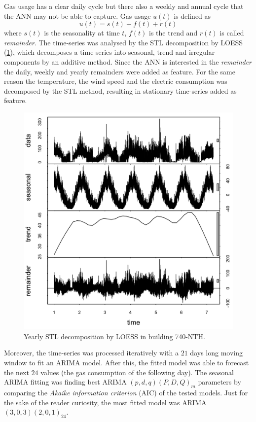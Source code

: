 \documentclass{sig-alternate-sigmod07}
\begin{document}
Gas usage has a clear daily cycle but there also a weekly and annual cycle that the ANN may not be able to capture. Gas usage $u(t)$ is defined as \begin{displaymath}u(t) = s(t) + f(t) + r(t)\end{displaymath} where $s(t)$ is the seasonality at time $t$, $f(t)$ is the trend and $r(t)$ is called \emph{remainder}. The time-series was analysed by the STL decomposition by LOESS \cite{cleveland1990stl}(\cref{fig:STL}), which decomposes a time-series into seasonal, trend and irregular components by an additive method. Since the ANN is interested in the \emph{remainder} the daily, weekly and yearly remainders were added as feature. For the same reason the temperature, the wind speed and the electric consumption was decomposed by the STL method, resulting in stationary time-series added as feature.

\begin{figure}
\centering
\includegraphics[width=\columnwidth]{images/STL.png}
\caption{Yearly STL decomposition by LOESS in building 740-NTH.}
\label{fig:STL}
\end{figure}

Moreover, the time-series was processed iteratively with a $21$ days long moving window to fit an ARIMA model. After this, the fitted model was able to forecast the next $24$ values (the gas consumption of the following day). The seasonal ARIMA fitting was finding best ARIMA $(p,d,q) (P,D,Q)_m$ parameters by comparing the \emph{Akaike information criterion} (AIC) of the tested models. Just for the sake of the reader curiosity, the most fitted model was ARIMA $(3,0,3) (2,0,1)_{24}$.
\end{document}
